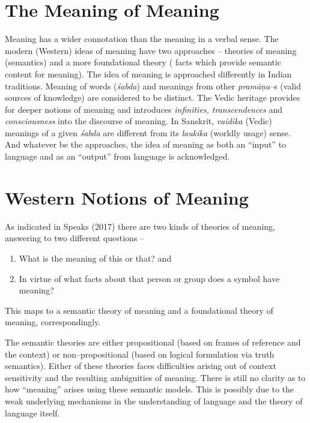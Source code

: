 \section*{The Meaning of Meaning}

Meaning has a wider connotation than the meaning in a verbal sense. The modern (Western) ideas of meaning have two approaches – theories of meaning (semantics) and a more foundational theory ( facts which provide semantic content for meaning). The idea of meaning is approached differently in Indian traditions. Meaning of words (\textit{śabda}) and meanings from other \textit{pramāṇa}–s (valid sources of knowledge) are considered to be distinct. The Vedic heritage provides for deeper notions of meaning and introduces \textit{infinities, transcendences} and \textit{consciousness} into the discourse of meaning. In Sanskrit, \textit{vaidika} (Vedic) meanings of a given \textit{śabda} are different from its \textit{laukika} (worldly usage) sense. And whatever be the approaches, the idea of meaning as both an “input” to language and as an “output” from language is acknowledged.

\newpage


\section*{Western Notions of Meaning}

\vskip -5pt

As indicated in Speaks (2017) there are two kinds of theories of meaning, answering to two different questions –

\begin{enumerate}
\itemsep=0pt
\item What is the meaning of this or that? and

 \item In virtue of what facts about that person or group does a symbol have meaning?

\end{enumerate}

This maps to a semantic theory of meaning and a foundational theory of meaning, correspondingly.

The semantic theories are either propositional (based on frames of reference and the context) or non–propositional (based on logical formulation via truth semantics). Either of these theories faces difficulties arising out of context sensitivity and the resulting ambiguities of meaning. There is still no clarity as to how “meaning” arises using these semantic models. This is possibly due to the weak underlying mechanisms in the understanding of language and the theory of language itself.

